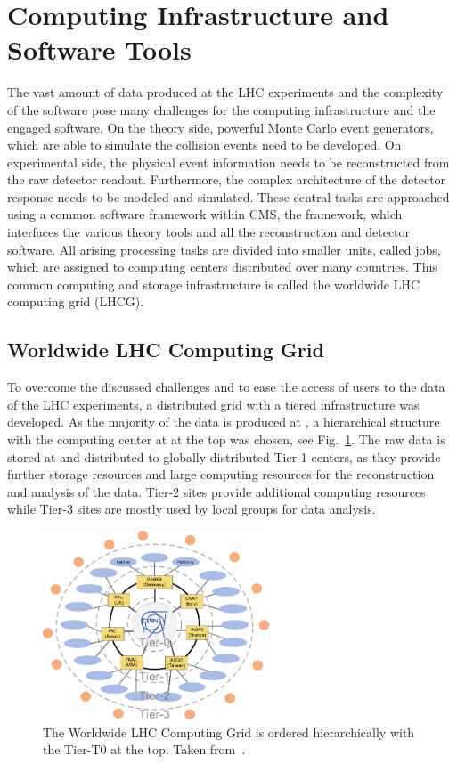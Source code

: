 \section{Computing Infrastructure and Software Tools}

The vast amount of data produced at the LHC experiments and the complexity of
the software pose many challenges for the computing infrastructure and the
engaged software. On the theory side, powerful Monte Carlo event generators,
which are able to simulate the collision events need to be developed. On
experimental side, the physical event information needs to be reconstructed from
the raw detector readout. Furthermore, the complex architecture of the detector
response needs to be modeled and simulated. These central tasks are approached
using a common software framework within CMS, the \CMSSW framework, which
interfaces the various theory tools and all the reconstruction and detector
software. All arising processing tasks are divided into smaller units, called
jobs, which are assigned to computing centers distributed over many countries.
This common computing and storage infrastructure is called the worldwide LHC
computing grid (LHCG).

\subsection{Worldwide LHC Computing Grid}

To overcome the discussed challenges and to ease the access of users to the data of
the LHC experiments, a distributed grid with a tiered infrastructure was
developed. As the majority of the data is produced at \CERN, a hierarchical
structure with the computing center at \CERN at the top was
chosen, see Fig.~\ref{fig:lhc_tier_structure}. The raw data is stored at \CERN
and distributed to globally distributed Tier-1 centers, as they provide further
storage resources and large computing resources for the reconstruction and
analysis of the data. Tier-2 sites provide additional computing resources while
Tier-3 sites are mostly used by local groups for data analysis.

\begin{figure}[htp]
    \centering
    \includegraphics[width=0.6\textwidth]{figures/experimental_setup/lhcg.pdf}\hfill
    \caption[Tiered structure of the worldwide LHC Computing Grid]{The Worldwide
        LHC Computing Grid is ordered hierarchically with the \CERN Tier-T0 at the top. Taken
        from~\cite{Stober:2012abc}.}
    \label{fig:lhc_tier_structure}
\end{figure}

